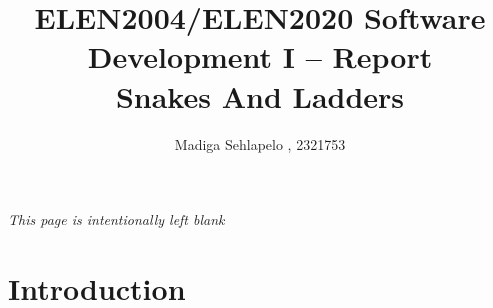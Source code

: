 

\title{ELEN2004/ELEN2020 Software Development I -- Report \\ Snakes And Ladders}

\author{Madiga Sehlapelo , 2321753}
\maketitle 
\pagestyle{fancy}
\fancyhf{}
\fancyhead[R]{\thepage}
\newpage
\tableofcontents
{}
\newpage
{} 
\begin{center}
	\textit{This page is intentionally left blank}
\end{center}

\newpage
\section*{Introduction}


 

